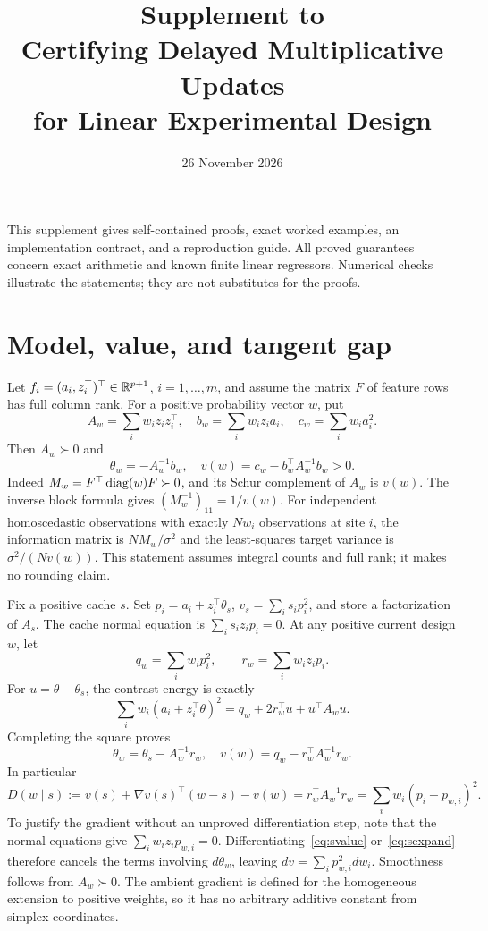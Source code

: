\documentclass[11pt]{article}
\title{Supplement to\\Certifying Delayed Multiplicative Updates\\for Linear Experimental Design}
\author{}\date{26 November 2026}
\begin{document}
\maketitle\internalnotice
This supplement gives self-contained proofs, exact worked examples, an implementation contract, and a reproduction guide. All proved guarantees concern exact arithmetic and known finite linear regressors. Numerical checks illustrate the statements; they are not substitutes for the proofs.

\section{Model, value, and tangent gap}
Let $f_i=(a_i,z_i^\top)^\top\in\mathbb R^{p+1}$, $i=1,\ldots,m$, and assume the matrix $F$ of feature rows has full column rank. For a positive probability vector $w$, put
\[
 A_w=\sum_iw_iz_iz_i^\top,\quad b_w=\sum_iw_iz_ia_i,
 \quad c_w=\sum_iw_i a_i^2.
\]
Then $A_w\succ0$ and
\begin{equation}\label{eq:svalue}
 \theta_w=-A_w^{-1}b_w,\quad
 v(w)=c_w-b_w^\top A_w^{-1}b_w>0.
\end{equation}
Indeed $M_w=F^\top\operatorname{diag}(w)F\succ0$, and its Schur complement of $A_w$ is $v(w)$. The inverse block formula gives $(M_w^{-1})_{11}=1/v(w)$. For independent homoscedastic observations with exactly $Nw_i$ observations at site $i$, the information matrix is $NM_w/\sigma^2$ and the least-squares target variance is $\sigma^2/(Nv(w))$. This statement assumes integral counts and full rank; it makes no rounding claim.

Fix a positive cache $s$. Set $p_i=a_i+z_i^\top\theta_s$, $v_s=\sum_i s_i p_i^2$, and store a factorization of $A_s$. The cache normal equation is $\sum_i s_i z_i p_i=0$. At any positive current design $w$, let
\[
 q_w=\sum_iw_ip_i^2,\qquad r_w=\sum_iw_iz_ip_i.
\]
For $u=\theta-\theta_s$, the contrast energy is exactly
\begin{equation}\label{eq:sexpand}
 \sum_iw_i(a_i+z_i^\top\theta)^2
 =q_w+2r_w^\top u+u^\top A_wu.
\end{equation}
Completing the square proves
\begin{equation}\label{eq:sresid}
 \theta_w=\theta_s-A_w^{-1}r_w,\quad
 v(w)=q_w-r_w^\top A_w^{-1}r_w.
\end{equation}
In particular
\[
 D(w\mid s):=v(s)+\nabla v(s)^\top(w-s)-v(w)
 =r_w^\top A_w^{-1}r_w
 =\sum_iw_i(p_i-p_{w,i})^2.
\]
To justify the gradient without an unproved differentiation step, note that the normal equations give $\sum_i w_i z_i p_{w,i}=0$. Differentiating~\eqref{eq:svalue} or~\eqref{eq:sexpand} therefore cancels the terms involving $d\theta_w$, leaving $dv=\sum_i p_{w,i}^2dw_i$. Smoothness follows from $A_w\succ0$. The ambient gradient is defined for the homogeneous extension to positive weights, so it has no arbitrary additive constant from simplex coordinates.
\end{document}
